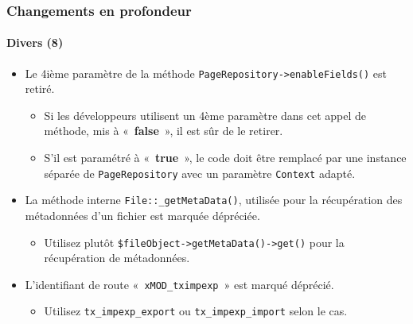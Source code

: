 \begin{frame}[fragile]
	\frametitle{Changements en profondeur}
	\framesubtitle{Divers (8)}

	\begin{itemize}

		\item Le 4ième paramètre de la méthode \texttt{PageRepository->enableFields()} est retiré.

		\begin{itemize}\smaller
			\item[\ding{228}] Si les développeurs utilisent un 4ème paramètre dans cet appel de méthode,
				mis à «~\textbf{false}~», il est sûr de le retirer.
			\item[\ding{228}] S'il est paramétré à «~\textbf{true}~», le code doit être remplacé par une
				instance séparée de \texttt{PageRepository} avec un paramètre \texttt{Context} adapté.
		\end{itemize}\normalsize

		\item La méthode interne \texttt{File::\_getMetaData()}, utilisée pour la récupération des
			métadonnées d'un fichier est marquée dépréciée.

			\begin{itemize}\smaller
				\item[\ding{228}] Utilisez plutôt \texttt{\$fileObject->getMetaData()->get()} pour la récupération de métadonnées.
			\end{itemize}\normalsize

		\item L'identifiant de route «~\texttt{xMOD\_tximpexp}~» est marqué déprécié.

			\begin{itemize}\smaller
				\item[\ding{228}] Utilisez \texttt{tx\_impexp\_export} ou \texttt{tx\_impexp\_import} selon le cas.
			\end{itemize}\normalsize

	\end{itemize}

\end{frame}


